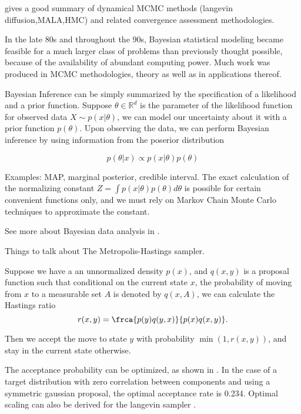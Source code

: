\documentclass{book}
\begin{document}
\cite{green2015bayesian} gives a good summary of dynamical MCMC methods (langevin diffusion,MALA,HMC) and related convergence assessment methodologies.

In the late 80s and throughout the 90s, Bayesian statistical modeling became
feasible for a much larger class of problems than previously thought possible,
because of the availability of abundant computing power. Much work was produced
in MCMC methodologies\cite{robert2013monte}, theory\cite{tierney1994markov,roberts2004general} as well as in applications thereof.  

Bayesian Inference can be simply summarized by the specification of a likelihood and a prior function. Suppose $\theta \in \mathbb{R}^d$ is the parameter of the likelihood function for observed data $X \sim p(x| \theta)$, we can
model our uncertainty about it with a prior function $p(\theta)$. Upon observing the data, we can perform Bayesian inference by using information from the poserior distribution 

\[ p(\theta | x ) \propto p(x | \theta) p(\theta) \]

Examples: MAP, marginal posterior, credible interval. The exact calculation of the normalizing constant $Z = \int p(x | \theta) p(\theta) d\theta $ is possible for certain convenient functions only, and we must rely on Markov Chain Monte Carlo techniques to approximate the constant. 

See more about Bayesian data analysis in \cite{gelman2014bayesian}. 

Things to talk about 
The Metropolis-Hastings sampler.

Suppose we have a an unnormalized density $p(x)$, and $q(x,y)$ is a proposal function such that conditional on the current state $x$, the probability of moving from $x$ to a measurable set $A$ is denoted by $q(x,A)$, we can calculate the Hastings ratio
\[ r(x,y) = \frca{p(y)q(y,x)}{p(x)q(x,y)}. \]

Then we accept the move to state $y$ with probability $ \min (1, r(x,y)) $, and stay in the current state otherwise.

The acceptance probability can be optimized, as shown in \cite{roberts1997weak,gelman1996efficient,roberts2001optimal}. In the case of a target distribution with zero correlation between components and using a symmetric gaussian proposal, the optimal acceptance rate is 0.234. Optimal scaling can also be derived for the langevin sampler \cite{roberts1998optimal}.
\end{document}
